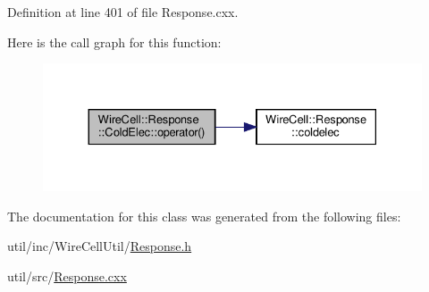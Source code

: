 Definition at line 401 of file Response.\+cxx.

Here is the call graph for this function\+:
\nopagebreak
\begin{figure}[H]
\begin{center}
\leavevmode
\includegraphics[width=330pt]{class_wire_cell_1_1_response_1_1_cold_elec_a488dd88ca0566ba96fbd9df9c6d3e9b7_cgraph}
\end{center}
\end{figure}


The documentation for this class was generated from the following files\+:\begin{DoxyCompactItemize}
\item 
util/inc/\+Wire\+Cell\+Util/\hyperlink{_response_8h}{Response.\+h}\item 
util/src/\hyperlink{_response_8cxx}{Response.\+cxx}\end{DoxyCompactItemize}
